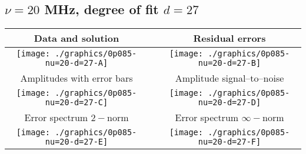 

% 

\clearpage{}
\break{}

\subsection{$\nu = 20$ MHz, degree of fit $d = 27$}

\begin{table}[h]
    \begin{center}
        \begin{tabular}{ccc}
            Data and solution & \quad & Residual errors \\\hline
            \texttt{[image: ./graphics/0p085-nu=20-d=27-A]} &&
            \texttt{[image: ./graphics/0p085-nu=20-d=27-B]} \\[15pt]
            Amplitudes with error bars && Amplitude signal--to--noise \\\hline
            \texttt{[image: ./graphics/0p085-nu=20-d=27-C]} &&
            \texttt{[image: ./graphics/0p085-nu=20-d=27-D]} \\[15pt]
            Error spectrum $2-$norm && Error spectrum $\infty-$norm \\\hline
            \texttt{[image: ./graphics/0p085-nu=20-d=27-E]} &&
            \texttt{[image: ./graphics/0p085-nu=20-d=27-F]} \\[15pt]
        \end{tabular}
    \end{center}
\label{fig:elev=85, nu=20}
\end{table}



\endinput

